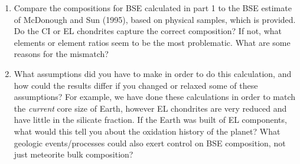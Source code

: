 \documentclass{template}
\newcommand{\solution}[1]{%
  \iftoggle{showanswers}{%
    \begin{solutionbox}
        #1
    \end{solutionbox}%
  }{}%
}
\begin{document}
\begin{enumerate}[label=\textbf{\arabic*.}]
\begin{enumerate}[label=\Alph*)]
        \item Compare the compositions for BSE calculated in part 1 to the BSE estimate of McDonough and Sun (1995), based on physical samples, which is provided. Do the CI or EL chondrites capture the correct composition? If not, what elements or element ratios seem to be the most problematic. What are some reasons for the mismatch?

        \item What assumptions did you have to make in order to do this calculation, and how could the results differ if you changed or relaxed some of these assumptions? For example, we have done these calculations in order to match the \textit{current} core size of Earth, however EL chondrites are very reduced and have little  in the silicate fraction. If the Earth was built of EL components, what would this tell you about the oxidation history of the planet? What geologic events/processes could also exert control on BSE composition, not just meteorite bulk composition?

    \end{enumerate}

    \solution{
        Answers for 5A--C where computed in a Jupyter notebook, which is attached as at the end as a PDF.
    }

    \vspace{0.5em}


\end{enumerate}
\end{document}
